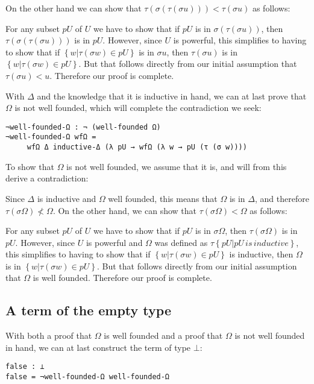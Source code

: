 \documentclass[runningheads]{llncs}
\begin{document}
On the other hand we can show that $\tau (\sigma (\tau (\sigma u))) < \tau
(\sigma u)$ as follows:

For any subset $pU$ of $U$ we have to show that if $pU$ is in $\sigma (\tau
(\sigma u))$, then $\tau (\sigma (\tau (\sigma u)))$ is in $pU$. However, since
$U$ is powerful, this simplifies to having to show that if $\left \{w | \tau
(\sigma w) \in pU \right \}$ is in $\sigma u$, then $\tau (\sigma u)$ is in
$\left \{w | \tau (\sigma w) \in pU \right \}$. But that follows directly from
our initial assumption that $\tau (\sigma u) < u$. Therefore our proof is
complete.

With $\Delta$ and the knowledge that it is inductive in hand, we can at last
prove that $\Omega$ is not well founded, which will complete the contradiction
we seek:

\begin{verbatim}
¬well-founded-Ω : ¬ (well-founded Ω)
¬well-founded-Ω wfΩ =
     wfΩ Δ inductive-Δ (λ pU → wfΩ (λ w → pU (τ (σ w))))
\end{verbatim}

To show that $\Omega$ is not well founded, we assume that it is, and will from
this derive a contradiction:

Since $\Delta$ is inductive and $\Omega$ well founded, this means that $\Omega$
is in $\Delta$, and therefore $\tau (\sigma \Omega) \nless \Omega$. On the other
hand, we can show that $\tau (\sigma \Omega) < \Omega$ as follows:

For any subset $pU$ of $U$ we have to show that if $pU$ is in $\sigma \Omega$,
then $\tau (\sigma \Omega)$ is in $pU$. However, since $U$ is powerful and
$\Omega$ was defined as $\tau \left \{ pU | pU \, is \, inductive \right \}$,
this simplifies to having to show that if $\left \{w | \tau (\sigma w) \in pU
\right \}$ is inductive, then $\Omega$ is in $\left \{w | \tau (\sigma w) \in pU
\right \}$. But that follows directly from our initial assumption that $\Omega$
is well founded. Therefore our proof is complete.

\subsection{A term of the empty type}

With both a proof that $\Omega$ is well founded and a proof that $\Omega$ is not
well founded in hand, we can at last construct the term of type $\bot$:

\begin{verbatim}
false : ⊥
false = ¬well-founded-Ω well-founded-Ω
\end{verbatim}
\end{document}
